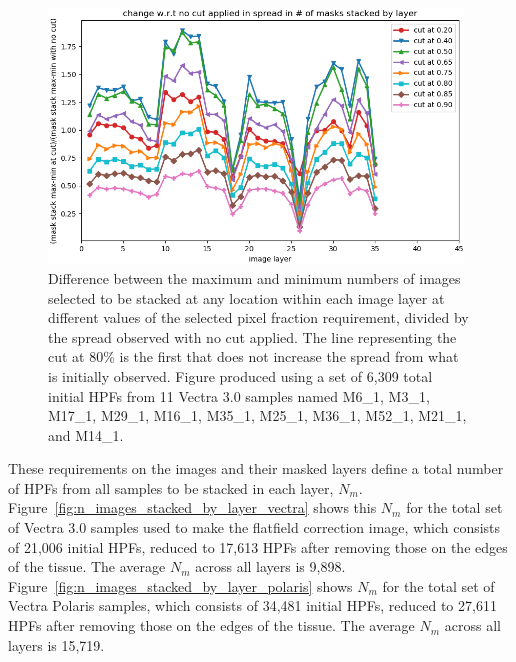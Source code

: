 \documentclass[letterpaper,11pt]{article}
\newcommand{\reffig}[1]{Figure~\ref{#1}}
\begin{document}
\begin{figure}[!ht]
\centering
\includegraphics[width=0.98\textwidth]{images/measuring_flatfield_corrections/example_mask_stack_spreads_by_layer}
\caption{\footnotesize Difference between the maximum and minimum numbers of images selected to be stacked at any location within each image layer at different values of the selected pixel fraction requirement, divided by the spread observed with no cut applied. The line representing the cut at 80\% is the first that does not increase the spread from what is initially observed. Figure produced using a set of 6,309 total initial HPFs from 11 Vectra 3.0 samples named M6\_1, M3\_1, M17\_1, M29\_1, M16\_1, M35\_1, M25\_1, M36\_1, M52\_1, M21\_1, and M14\_1.}
\label{fig:selected_pixel_fraction_cut_2}
\end{figure} 

These requirements on the images and their masked layers define a total number of HPFs from all samples to be stacked in each layer, $N_{m}$. \reffig{fig:n_images_stacked_by_layer_vectra} shows this $N_{m}$ for the total set of Vectra 3.0 samples used to make the flatfield correction image, which consists of 21,006 initial HPFs, reduced to 17,613 HPFs after removing those on the edges of the tissue. The average $N_{m}$ across all layers is 9,898. \reffig{fig:n_images_stacked_by_layer_polaris} shows $N_{m}$ for the total set of Vectra Polaris samples, which consists of 34,481 initial HPFs, reduced to 27,611 HPFs after removing those on the edges of the tissue. The average $N_{m}$ across all layers is 15,719.
\end{document}
